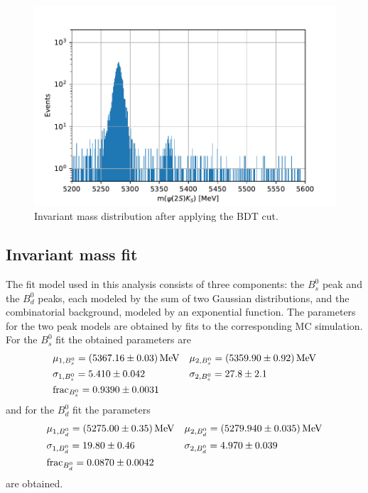 \begin{figure}[tb]
  \centering
  \includegraphics[width=.8\textwidth]{plots/signal_window_cut.pdf}
  \caption{Invariant mass distribution after applying the BDT cut.}
  \label{fig:mass_cut}
\end{figure}

\subsection{Invariant mass fit}
The fit model used in this analysis consists of three components: the $B^0_s$ peak and the $B^0_d$ peaks, each modeled by the sum of two Gaussian distributions, and the combinatorial background, modeled by an exponential function. The parameters for the two peak models are obtained by fits to the corresponding MC simulation. For the $B^0_s$ fit the obtained parameters are
\begin{align*}
  &\mu_{1, B^0_s} = \SI{5367.16 \pm 0.03}{\mega\eV} && \mu_{2, B^0_s} = \SI{5359.9 \pm 0.92}{\mega\eV}\\
  &\sigma_{1, B^0_s} = \num{5.41 \pm 0.042} && \sigma_{2, B^0_s} = \num{27.8 \pm 2.1}\\
  &\mathrm{frac}_{B^0_s} = \num{0.939 \pm 0.0031}
\end{align*}
and for the $B^0_d$ fit the parameters
\begin{align*}
  &\mu_{1, B^0_d} = \SI{5275.0 \pm 0.35}{\mega\eV} && \mu_{2, B^0_d} = \SI{5279.94 \pm 0.035}{\mega\eV}\\
  &\sigma_{1, B^0_d} = \num{19.8 \pm 0.46} && \sigma_{2, B^0_d} = \num{4.97 \pm 0.039}\\
  &\mathrm{frac}_{B^0_d} = \num{0.0870 \pm 0.0042}
\end{align*}
are obtained.

